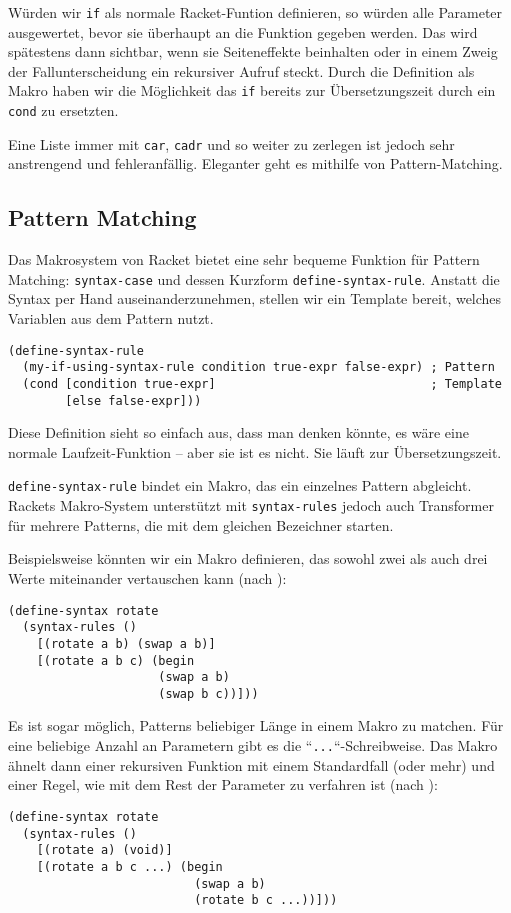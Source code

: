 Würden wir \texttt{if} als normale Racket-Funtion definieren, so würden alle Parameter ausgewertet, bevor sie überhaupt an die Funktion gegeben werden. Das wird spätestens dann sichtbar, wenn sie Seiteneffekte beinhalten oder in einem Zweig der Fallunterscheidung ein rekursiver Aufruf steckt. Durch die Definition als Makro haben wir die Möglichkeit das \texttt{if} bereits zur Übersetzungszeit durch ein \texttt{cond} zu ersetzten.


Eine Liste immer mit \texttt{car}, \texttt{cadr} und so weiter zu zerlegen ist jedoch sehr anstrengend und fehleranfällig. Eleganter geht es mithilfe von Pattern-Matching. %


\subsection{Pattern Matching}
Das Makrosystem von Racket bietet eine sehr bequeme Funktion für Pattern Matching: \texttt{syntax-case} und dessen Kurzform \texttt{define-syntax-rule}. Anstatt die Syntax per Hand auseinanderzunehmen, stellen wir ein Template bereit, welches Variablen aus dem Pattern nutzt.

\begin{lstlisting}
(define-syntax-rule 
  (my-if-using-syntax-rule condition true-expr false-expr) ; Pattern
  (cond [condition true-expr]                              ; Template
        [else false-expr]))
\end{lstlisting}

Diese Definition sieht so einfach aus, dass man denken könnte, es wäre eine normale Laufzeit-Funktion -- aber sie ist es nicht. Sie läuft zur Übersetzungszeit. 


\texttt{define-syntax-rule} bindet ein Makro, das ein einzelnes Pattern abgleicht. Rackets Makro-System unterstützt mit \texttt{syntax-rules} jedoch auch Transformer für mehrere Patterns, die mit dem gleichen Bezeichner starten.

Beispielsweise könnten wir ein Makro definieren, das sowohl zwei als auch drei Werte miteinander vertauschen kann (nach \cite{racketguide-macros}):

\begin{lstlisting}
(define-syntax rotate
  (syntax-rules ()
    [(rotate a b) (swap a b)]
    [(rotate a b c) (begin
                     (swap a b)
                     (swap b c))]))
\end{lstlisting}

Es ist sogar möglich, Patterns beliebiger Länge in einem Makro zu matchen. Für eine beliebige Anzahl an Parametern gibt es die ``\texttt{...}``-Schreibweise. Das Makro ähnelt dann einer rekursiven Funktion mit einem Standardfall (oder mehr) und einer Regel, wie mit dem Rest der Parameter zu verfahren ist (nach \cite{racketguide-macros}):

\begin{lstlisting}
(define-syntax rotate
  (syntax-rules ()
    [(rotate a) (void)]
    [(rotate a b c ...) (begin
                          (swap a b)
                          (rotate b c ...))]))
\end{lstlisting}


